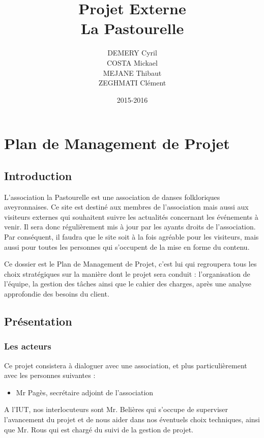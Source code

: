 \documentclass[11pt]{report}
\title{Projet Externe\\La Pastourelle}
\author{DEMERY Cyril\\COSTA Mickael\\MEJANE Thibaut\\ZEGHMATI Clément}
\date{2015-2016}
\begin{document}
\maketitle
\setcounter{tocdepth}{5}
\tableofcontents
\chapter{Plan de Management de Projet}
\section{Introduction}
L’association la Pastourelle est une association de danses folkloriques 
aveyronnaises. Ce site est destiné aux membres de l’association mais aussi aux 
visiteurs externes qui souhaitent suivre les actualités concernant les 
événements à venir. Il sera donc régulièrement mis à jour par les ayants 
droits de l’association. Par conséquent, il faudra que le site soit à la fois 
agréable pour les visiteurs, mais aussi pour toutes les personnes qui 
s'occupent de la mise en forme du contenu.\\

\par Ce dossier est le Plan de Management de Projet, c'est lui qui regroupera 
tous les choix stratégiques sur la manière dont le projet sera conduit : 
l'organisation de l'équipe, la gestion des tâches ainsi que le cahier des 
charges, après une analyse approfondie des besoins du client.

\section{Présentation}
\subsection{Les acteurs}
Ce projet consistera à dialoguer avec une association, et plus particulièrement 
avec les personnes suivantes : 
\begin{itemize}
    \item Mr Pagès, secrétaire adjoint de l’association\\
\end{itemize}

\par A l'IUT, nos interlocuteurs sont Mr. Belières qui s'occupe de superviser 
l'avancement du projet et de nous aider dans nos éventuels choix techniques, 
ainsi que Mr. Rous qui est chargé du suivi de la gestion de projet.   \\
\end{document}
